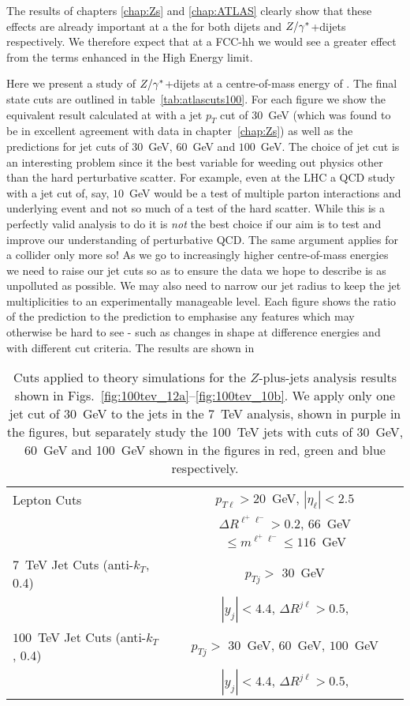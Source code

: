 	The results of chapters \ref{chap:Zs} and \ref{chap:ATLAS} clearly show that these effects are already important
	at a the \stev for both dijets and $Z/\gamma^*$+dijets respectively.  We therefore expect that at a \htev FCC-hh we would
	see a greater effect from the terms enhanced in the High Energy limit.

	Here we present a study of $Z/\gamma^*$+dijets at a centre-of-mass energy of \htev.  The final state cuts
	are outlined in table~\eqref{tab:atlascuts100}.  For each figure we show the equivalent result calculated
	at \stev with a jet $p_T$ cut of $30$~GeV (which was found to be in excellent agreement with data in chapter~\ref{chap:Zs}) as
	well as the \htev predictions for jet cuts of $30$~GeV, $60$~GeV and $100$~GeV.  The choice of jet cut
	is an interesting problem since it the best variable for weeding out physics other than the hard
	perturbative scatter.  For example, even at the \stev LHC a QCD study with a jet cut of, say,
	$10$~GeV would be a test of multiple parton interactions and underlying event and not so much of a test
	of the hard scatter.  While this is a perfectly valid analysis to do it is \emph{not} the best choice if our aim is to test and
	improve our understanding of perturbative QCD.  The same argument applies for a \htev collider
	only more so!  As we go to increasingly higher centre-of-mass energies we need to raise our
	jet cuts so as to ensure the data we hope to describe is as unpolluted as possible.  We may also need to
	narrow our jet radius to keep the jet multiplicities to an experimentally manageable level.  Each figure
	shows the ratio of the \htev prediction to the \stev prediction to emphasise any features
	which may otherwise be hard to see - such as changes in shape at difference energies and with different cut criteria.  The \stev results are shown in

	\begin{table}[bth]
	  \centering
	  \begin{tabular}{|l|c|}
	    \hline
	    Lepton Cuts & $p_{T\ell}>20$~GeV, \; $|\eta_\ell|<2.5$ \\
	    & $\Delta R^{\ell^+\ell^-} > 0.2$, \; $66$~GeV $\leq m^{\ell^+\ell^-} \leq
	      116$~GeV \\ \hline
	    $7$~TeV Jet Cuts (anti-$k_T$, 0.4) & $p_{Tj}>$ $30$~GeV \\
	    &  $|y_j|<4.4$, \;$\Delta R^{j\ell} >0.5$,  \\ \hline
	    $100$~TeV Jet Cuts (anti-$k_T$, 0.4) & $p_{Tj}>$ $30$~GeV, $60$~GeV, $100$~GeV \\
	    &  $|y_j|<4.4$, \;$\Delta R^{j\ell} >0.5$,  \\ \hline
	  \end{tabular}
	  \caption{Cuts applied to theory simulations for the \htev
	    $Z$-plus-jets analysis results shown in Figs.~\eqref{fig:100tev_12a}--\eqref{fig:100tev_10b}.  We apply only one
	    jet cut of 30~GeV to the jets in the 7~TeV analysis, shown in purple in the figures, but separately study
	    the 100~TeV jets with cuts of 30~GeV, 60~GeV and 100~GeV shown in the figures in red, green and blue respectively.}
	  \label{tab:atlascuts100}
	\end{table}

